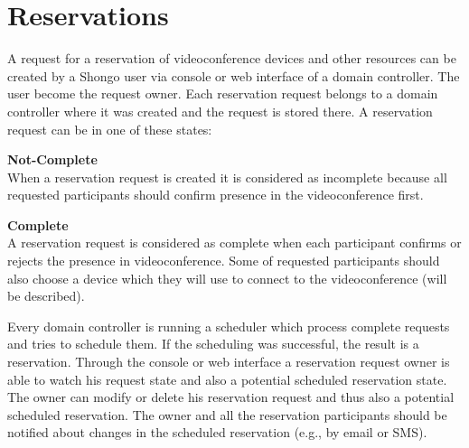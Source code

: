 \chapter{Reservations}

A request for a reservation of videoconference devices and other resources can be created by a Shongo user via console or web interface of a domain controller. The user become the request owner. Each reservation request belongs to a domain controller where it was created and the request is stored there. A reservation request can be in one of these states:
\begin{compactenum}
\item \textbf{Not-Complete} \\
  When a reservation request is created it is considered as incomplete 
  because all requested participants should confirm presence in
  the videoconference first.
\item \textbf{Complete} \\
  A reservation request is considered as complete when each participant 
  confirms or rejects the presence in videoconference. Some of
  requested participants should also choose a device which they will use 
  to connect to the videoconference (will be described).
\end{compactenum}
Every domain controller is running a scheduler which process complete requests and tries to schedule them. If the scheduling was successful, the result is a reservation. Through the console or web interface a reservation request owner is able to watch his request state and also a potential scheduled reservation state. The owner can modify or delete his reservation request and thus also a potential scheduled reservation. The owner and all the reservation participants should be notified about changes in the scheduled reservation (e.g., by email or SMS). 

